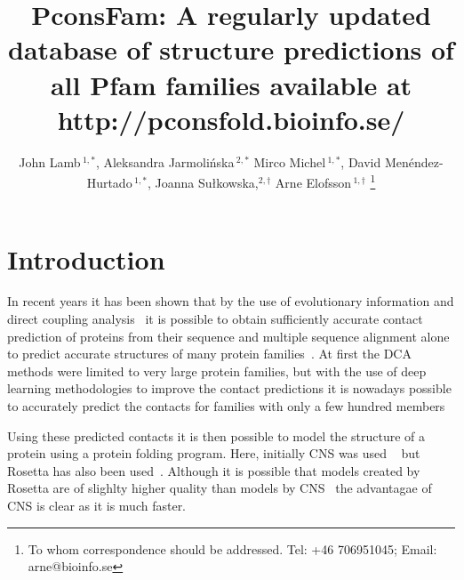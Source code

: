 \documentclass[a4,center,fleqn]{NAR}
\begin{document}
\title{PconsFam: A regularly updated database of structure predictions of all Pfam families available at http://pconsfold.bioinfo.se/}

\author{%
John Lamb\,$^{1,*}$,
Aleksandra Jarmolińska\,$^{2,*}$
Mirco Michel\,$^{1,*}$,
David Menéndez-Hurtado\,$^{1,*}$,
Joanna Sułkowska,$^{2,\dagger}$
Arne Elofsson\,$^{1,\dagger}$%
\footnote{To whom correspondence should be addressed.
Tel: +46 706951045; Email: arne@bioinfo.se}}

\address{%
$^{1}$Science for Life Laboratory and Department of Biochemistry and
biophysics, Stockholm Unviersity, Tomtebodav 23, 171 21 Solna, Sweden
and
$^{2}$ Warsaw, Poland 
$^{*}$ contributed equally
$^{\dagger}$=contributing authors
}


\maketitle





\begin{abstract}


\end{abstract}

\section{Introduction}

In recent years it has been shown that by the use of evolutionary
information and direct coupling analysis~\cite{Weigt19116270} it is
possible to obtain sufficiently accurate contact prediction of
proteins from their sequence and multiple sequence alignment alone to
predict accurate structures of many protein
families~\cite{Sulkowska2012}. At first the DCA methods were limited
to very large protein families, but with the use of deep learning
methodologies to improve the contact predictions it is nowadays
possible to accurately predict the contacts for families with only a
few hundred members~\cite{Skwark25375897,Michel28535189,Wang28056090}

Using these predicted contacts it is then possible to model the
structure of a protein using a protein folding program. Here,
initially CNS was used ~\cite{Morcos22106262} but Rosetta has also
been used~\cite{Baker:1999}. Although it is possible that models
created by Rosetta are of slighlty higher quality than models by
CNS~\cite{Michel25161237} the advantagae of CNS is clear as it is much
faster. 
\end{document}
